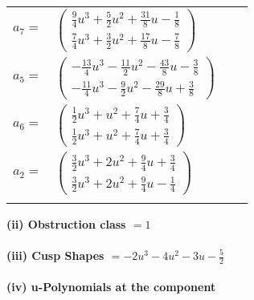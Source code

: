 \documentclass[1p]{elsarticle_modified}
\theoremstyle{definition}
\begin{document}
\begin{tabular}{m{7pt} m{180pt} m{7pt} m{180pt} }
\flushright $a_{7}=$&$\begin{pmatrix}\frac{9}{4} u^3+\frac{5}{2} u^2+\frac{31}{8} u-\frac{1}{8}\\\frac{7}{4} u^3+\frac{3}{2} u^2+\frac{17}{8} u-\frac{7}{8}\end{pmatrix}$ \\
\flushright $a_{5}=$&$\begin{pmatrix}-\frac{13}{4} u^3-\frac{11}{2} u^2-\frac{43}{8} u-\frac{3}{8}\\-\frac{11}{4} u^3-\frac{9}{2} u^2-\frac{29}{8} u+\frac{3}{8}\end{pmatrix}$ \\
\flushright $a_{6}=$&$\begin{pmatrix}\frac{1}{2} u^3+u^2+\frac{7}{4} u+\frac{3}{4}\\\frac{1}{2} u^3+u^2+\frac{7}{4} u+\frac{3}{4}\end{pmatrix}$ \\
\flushright $a_{2}=$&$\begin{pmatrix}\frac{3}{2} u^3+2 u^2+\frac{9}{4} u+\frac{3}{4}\\\frac{3}{2} u^3+2 u^2+\frac{9}{4} u-\frac{1}{4}\end{pmatrix}$\\&\end{tabular}
\flushleft \textbf{(ii) Obstruction class $= 1$}\\~\\
\flushleft \textbf{(iii) Cusp Shapes $= -2 u^3-4 u^2-3 u-\frac{5}{2}$}\\~\\
\newpage\renewcommand{\arraystretch}{1}
\flushleft \textbf{(iv) u-Polynomials at the component}\newline \\
\end{document}
